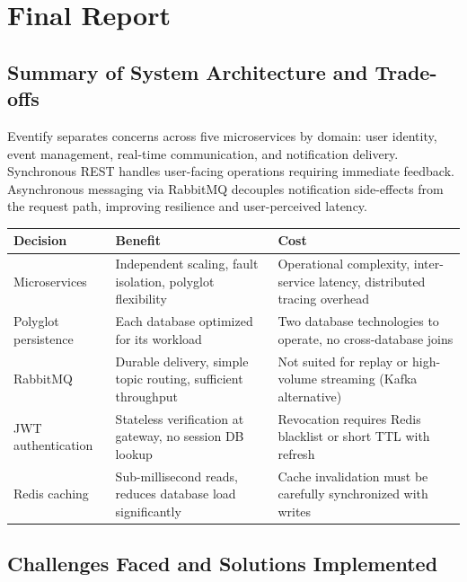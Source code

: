 \documentclass[12pt,a4paper]{article}
\begin{document}
\newpage

\section{Final Report}

\subsection{Summary of System Architecture and Trade-offs}

Eventify separates concerns across five microservices by domain: user identity, event management, real-time communication, and notification delivery. Synchronous REST handles user-facing operations requiring immediate feedback. Asynchronous messaging via RabbitMQ decouples notification side-effects from the request path, improving resilience and user-perceived latency.

\begin{longtable}{@{}p{4cm}p{4.5cm}p{4.5cm}@{}}
\toprule
\textbf{Decision} & \textbf{Benefit} & \textbf{Cost} \\
\midrule
Microservices & Independent scaling, fault isolation, polyglot flexibility & Operational complexity, inter-service latency, distributed tracing overhead \\
\midrule
Polyglot persistence & Each database optimized for its workload & Two database technologies to operate, no cross-database joins \\
\midrule
RabbitMQ & Durable delivery, simple topic routing, sufficient throughput & Not suited for replay or high-volume streaming (Kafka alternative) \\
\midrule
JWT authentication & Stateless verification at gateway, no session DB lookup & Revocation requires Redis blacklist or short TTL with refresh \\
\midrule
Redis caching & Sub-millisecond reads, reduces database load significantly & Cache invalidation must be carefully synchronized with writes \\
\bottomrule
\end{longtable}

\subsection{Challenges Faced and Solutions Implemented}
\end{document}
